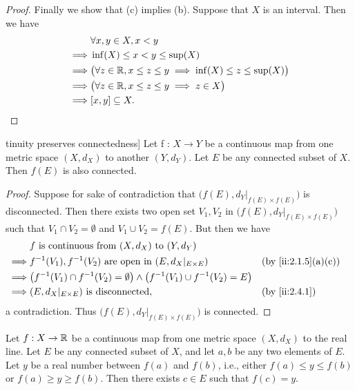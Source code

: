 \begin{proof}
  Finally we show that (c) implies (b).
  Suppose that \(X\) is an interval.
  Then we have
  \begin{align*}
             & \forall x, y \in X, x < y                                                        \\
    \implies & \inf(X) \leq x < y \leq \sup(X)                                                  \\
    \implies & \big(\forall z \in \mathbb{R}, x \leq z \leq y \implies \inf(X) \leq z \leq \sup(X)\big) \\
    \implies & \big(\forall z \in \mathbb{R}, x \leq z \leq y \implies z \in X\big)                     \\
    \implies & [x, y] \subseteq X.
  \end{align*}
\end{proof}

\begin{thm}tinuity preserves connectedness]\label{ii:2.4.6}
  Let f : \(X \to Y\) be a continuous map from one metric space \((X, d_X)\) to another \((Y, d_Y)\).
  Let \(E\) be any connected subset of \(X\).
  Then \(f(E)\) is also connected.
\end{thm}

\begin{proof}
  Suppose for sake of contradiction that \(\big(f(E), d_Y|_{f(E) \times f(E)}\big)\) is disconnected.
  Then there exists two open set \(V_1, V_2\) in \(\big(f(E), d_Y|_{f(E) \times f(E)}\big)\) such that \(V_1 \cap V_2 = \emptyset\) and \(V_1 \cup V_2 = f(E)\).
  But then we have
  \begin{align*}
             & f \text{ is continuous from } (X, d_X) \text{ to } (Y, d_Y)                                                                 \\
    \implies & f^{-1}(V_1), f^{-1}(V_2) \text{ are open in } (E, d_X|_{E \times E})                                &  & \by{ii:2.1.5}[a,c] \\
    \implies & \big(f^{-1}(V_1) \cap f^{-1}(V_2) = \emptyset\big) \land \big(f^{-1}(V_1) \cup f^{-1}(V_2) = E\big)                         \\
    \implies & (E, d_X|_{E \times E}) \text{ is disconnected},                                                     &  & \by{ii:2.4.1}
  \end{align*}
  a contradiction.
  Thus \(\big(f(E), d_Y|_{f(E) \times f(E)}\big)\) is connected.
\end{proof}

\begin{cor}\label{ii:2.4.7}
  Let \(f : X \to \mathbb{R}\) be a continuous map from one metric space \((X, d_X)\) to the real line.
  Let \(E\) be any connected subset of \(X\), and let \(a, b\) be any two elements of \(E\).
  Let \(y\) be a real number between \(f(a)\) and \(f(b)\), i.e., either \(f(a) \leq y \leq f(b)\) or \(f(a) \geq y \geq f(b)\).
  Then there exists \(c \in E\) such that \(f(c) = y\).
\end{cor}

